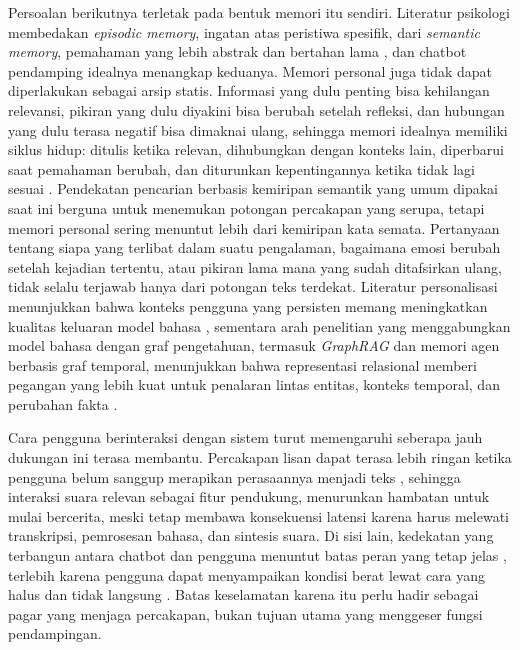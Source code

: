 Persoalan berikutnya terletak pada bentuk memori itu sendiri. Literatur psikologi membedakan \textit{episodic memory}, ingatan atas peristiwa spesifik, dari \textit{semantic memory}, pemahaman yang lebih abstrak dan bertahan lama \parencite{tulving1972}, dan chatbot pendamping idealnya menangkap keduanya. Memori personal juga tidak dapat diperlakukan sebagai arsip statis. Informasi yang dulu penting bisa kehilangan relevansi, pikiran yang dulu diyakini bisa berubah setelah refleksi, dan hubungan yang dulu terasa negatif bisa dimaknai ulang, sehingga memori idealnya memiliki siklus hidup: ditulis ketika relevan, dihubungkan dengan konteks lain, diperbarui saat pemahaman berubah, dan diturunkan kepentingannya ketika tidak lagi sesuai \parencite{zhong2024memorybank}. Pendekatan pencarian berbasis kemiripan semantik yang umum dipakai saat ini berguna untuk menemukan potongan percakapan yang serupa, tetapi memori personal sering menuntut lebih dari kemiripan kata semata. Pertanyaan tentang siapa yang terlibat dalam suatu pengalaman, bagaimana emosi berubah setelah kejadian tertentu, atau pikiran lama mana yang sudah ditafsirkan ulang, tidak selalu terjawab hanya dari potongan teks terdekat. Literatur personalisasi menunjukkan bahwa konteks pengguna yang persisten memang meningkatkan kualitas keluaran model bahasa \parencite{salemi2024lamp}, sementara arah penelitian yang menggabungkan model bahasa dengan graf pengetahuan, termasuk \textit{GraphRAG} dan memori agen berbasis graf temporal, menunjukkan bahwa representasi relasional memberi pegangan yang lebih kuat untuk penalaran lintas entitas, konteks temporal, dan perubahan fakta \parencite{pan2024, edge2024graphrag, rasmussen2025zep, saxenauts2025persona}.

Cara pengguna berinteraksi dengan sistem turut memengaruhi seberapa jauh dukungan ini terasa membantu. Percakapan lisan dapat terasa lebih ringan ketika pengguna belum sanggup merapikan perasaannya menjadi teks \parencite{pradhan2020}, sehingga interaksi suara relevan sebagai fitur pendukung, menurunkan hambatan untuk mulai bercerita, meski tetap membawa konsekuensi latensi karena harus melewati transkripsi, pemrosesan bahasa, dan sintesis suara. Di sisi lain, kedekatan yang terbangun antara chatbot dan pengguna menuntut batas peran yang tetap jelas \parencite{weidinger2022}, terlebih karena pengguna dapat menyampaikan kondisi berat lewat cara yang halus dan tidak langsung \parencite{pendse2022}. Batas keselamatan karena itu perlu hadir sebagai pagar yang menjaga percakapan, bukan tujuan utama yang menggeser fungsi pendampingan.

